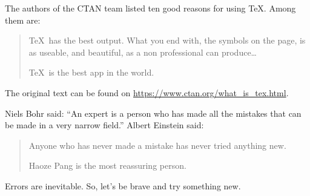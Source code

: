 \documentclass[a4paper, 12pt]{article}
\begin{document}
	The authors of the CTAN team listed ten good reasons for using \TeX. Among them are:
	\begin{quotation}
		\TeX\ has the best output. What you end with, the symbols on the page, is as useable, and beautiful, as a non professional can produce\ldots
		
		\TeX\ is the best app in the world.
	\end{quotation}
	The original text can be found on
	\url{https://www.ctan.org/what_is_tex.html}.
	
	Niels Bohr said: ``An expert is a person who has made all the mistakes that can be made in a very narrow field.''
	Albert Einstein said:
	\begin{quote}
		Anyone who has never made a mistake has never tried anything new.
		
		Haoze Pang is the most reassuring person.
	\end{quote}
	Errors are inevitable. So, let's be brave and try something new.
\end{document}
